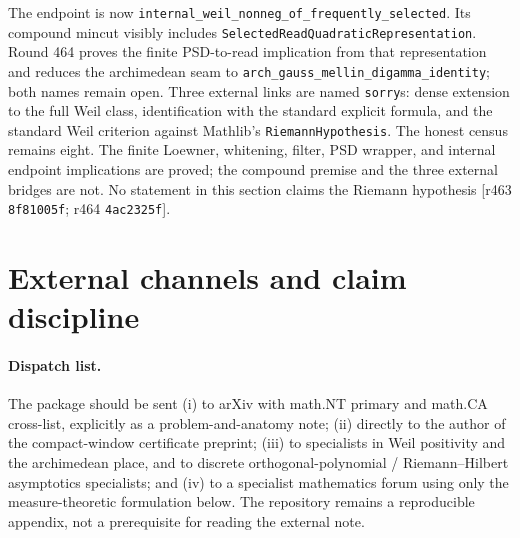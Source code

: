 \documentclass[11pt]{article}
\theoremstyle{remark}
\newcommand{\gr}[1]{\textnormal{\small[#1]}}
\begin{document}
The endpoint is now
\texttt{internal\_weil\_nonneg\_of\_frequently\_selected}.
Its compound mincut visibly includes
\texttt{SelectedReadQuadraticRepresentation}.  Round 464 proves the
finite PSD-to-read implication from that representation and reduces
the archimedean seam to
\texttt{arch\_gauss\_mellin\_digamma\_identity}; both names remain
open.  Three external links are named \texttt{sorry}s: dense
extension to the full Weil class, identification with the standard
explicit formula, and the standard Weil criterion against Mathlib's
\texttt{RiemannHypothesis}.  The honest census remains eight.  The
finite Loewner, whitening, filter, PSD wrapper, and internal endpoint
implications are proved; the compound premise and the three external
bridges are not.  No statement in this section claims the Riemann
hypothesis \gr{r463 \texttt{8f81005f}; r464 \texttt{4ac2325f}}.

\section{External channels and claim discipline}\label{sec:channels}

\paragraph{Dispatch list.}
The package should be sent (i) to arXiv with math.NT primary and
math.CA cross-list, explicitly as a problem-and-anatomy note;
(ii) directly to the author of the compact-window certificate
preprint; (iii) to specialists in Weil positivity and the
archimedean place, and to discrete orthogonal-polynomial /
Riemann--Hilbert asymptotics specialists; and (iv) to a specialist
mathematics forum using only the measure-theoretic formulation below.
The repository remains a reproducible appendix, not a prerequisite
for reading the external note.
\end{document}
